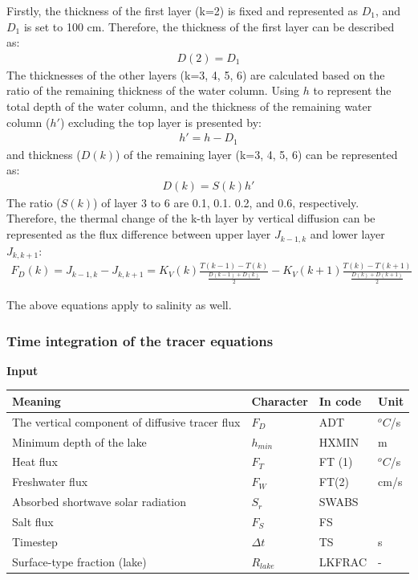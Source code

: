 Firstly, the thickness of the first layer (k=2) is fixed and represented as \(D_{1}\), and \(D_{1}\) is set to 100 cm. Therefore, the thickness of the first layer can be described as: \begin{eqnarray}
D(2)=D_{1}
\end{eqnarray} The thicknesses of the other layers (k=3, 4, 5, 6) are calculated based on the ratio of the remaining thickness of the water column. Using \(h\) to represent the total depth of the water column,
and the thickness of the remaining water column (\(h'\)) excluding the top layer is presented by: \begin{eqnarray}
h'=h-D_{1}
\end{eqnarray} and thickness (\(D(k)\)) of the remaining layer (k=3, 4, 5, 6) can be represented as: \begin{eqnarray}
D(k)=S(k)h'
\end{eqnarray} The ratio (\(S(k)\)) of layer 3 to 6 are 0.1, 0.1. 0.2, and 0.6, respectively. Therefore, the thermal change of the k-th layer by vertical diffusion can be represented as the flux difference
between upper layer \(J_{k-1, k}\) and lower layer \(J_{k, k+1}\): \begin{eqnarray}
F_{D}(k)=J_{k-1,k}-J_{k,k+1}=K_{V}(k)\frac{T(k-1)-T(k)}{\frac{D(k-1)+D(k)}{2}}-K_{V}(k+1)\frac{T(k)-T(k+1)}{\frac{D(k)+D(k+1)}{2}}
\end{eqnarray}

The above equations apply to salinity as well.

\subsubsection{Time integration of the tracer equations}\label{time-integration-of-the-tracer-equations}

\textbf{Input}

\begin{longtable}[]{@{}llll@{}}
\toprule\noalign{}
Meaning & Character & In code & Unit \\
\midrule\noalign{}
\endhead
\bottomrule\noalign{}
\endlastfoot
The vertical component of diffusive tracer flux & \(F_{D}\) & ADT & \(^{o}C\)/s \\
Minimum depth of the lake & \(h_{min}\) & HXMIN & m \\
Heat flux & \(F_{T}\) & FT (1) & \(^{o}C\)/s \\
Freshwater flux & \(F_{W}\) & FT(2) & cm/s \\
Absorbed shortwave solar radiation & \(S_{r}\) & SWABS & \\
Salt flux & \(F_{S}\) & FS & \\
Timestep & \(\Delta t\) & TS & s \\
Surface-type fraction (lake) & \(R_{lake}\) & LKFRAC & - \\
\end{longtable}

